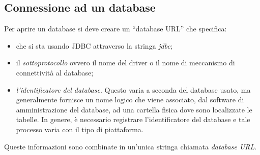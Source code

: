 \documentclass[12pt]{report}
\begin{document}
\subsection{Connessione ad un database}
Per aprire un database si deve creare un ``database URL'' che specifica:
\begin{itemize}
	\item che si sta usando JDBC attraverso la stringa \textit{jdbc};
	\item il \textit{sottoprotocollo} ovvero il nome del driver o il nome di meccanismo di connettività al database;
	\item \textit{l'identificatore del database}. Questo varia a seconda del database usato, ma generalmente fornisce un nome logico che viene associato, dal software di amministrazione del database, ad una cartella fisica dove sono localizzate le tabelle. In genere, è necessario registrare l'identificatore del database e tale processo varia con il tipo di piattaforma.
\end{itemize}
Queste informazioni sono combinate in un'unica stringa chiamata \textit{database URL}.
\end{document}

